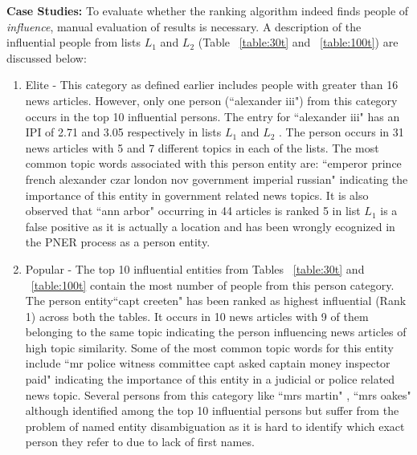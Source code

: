 \noindent \textbf{Case Studies: } To evaluate whether the ranking algorithm indeed finds people of \emph{influence}, manual evaluation of results is necessary. A description of the influential people from lists $L_1$ and $L_2$  (Table ~\ref{table:30t} and ~\ref{table:100t}) are discussed below: 
\begin{enumerate}

\item Elite - This category as defined earlier includes people with greater than 16 news articles. However, only one person  (``alexander iii") from this category occurs in the top 10 influential persons. The entry for ``alexander iii" has an IPI of 2.71 and 3.05 respectively in lists $L_1$ and $L_2$ . The person occurs in 31 news articles with 5 and 7 different topics in each of the lists. The most common topic words associated with this person entity are: ``emperor prince french alexander czar london nov government imperial russian" indicating the importance of this entity in government related news topics. 
It is also observed that ``ann arbor" occurring in 44 articles is ranked 5 in list $L_1$ is a false positive as it is actually a location and has been wrongly ecognized in the PNER process as a person entity. 

\item Popular - The top 10 influential entities from Tables ~\ref{table:30t} and ~\ref{table:100t} contain the most number of people from this person category. The person entity``capt creeten" has been ranked as highest influential (Rank 1) across both the tables. It occurs in 10 news articles with 9 of them belonging to the same topic indicating the person influencing news articles of high topic similarity. Some of the most common topic words for this entity include ``mr police witness committee capt asked captain money inspector paid" indicating the importance of this entity in a judicial or police related news topic.
Several persons from this category like ``mrs martin" , ``mrs oakes"  although identified among the top 10 influential persons but suffer from the problem of named entity disambiguation as it is hard to identify which exact person they refer to due to lack of first names.
 

\end{enumerate}
